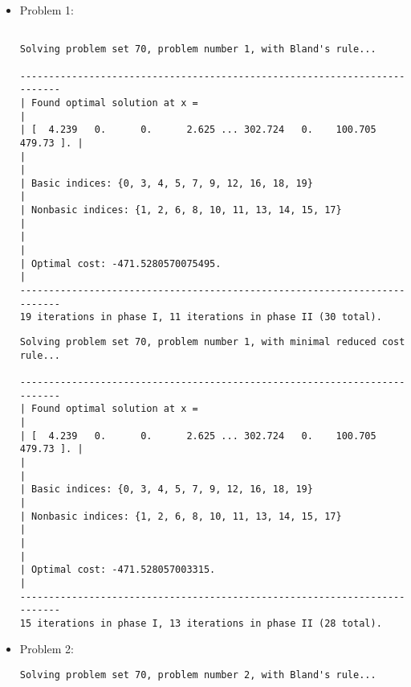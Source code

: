 \documentclass[a4paper]{article}
\begin{document}
\begin{itemize}
    \item Problem 1:
\begin{verbatim}

Solving problem set 70, problem number 1, with Bland's rule...

--------------------------------------------------------------------------
| Found optimal solution at x =                                          |
| [  4.239   0.      0.      2.625 ... 302.724   0.    100.705 479.73 ]. |
|                                                                        |
| Basic indices: {0, 3, 4, 5, 7, 9, 12, 16, 18, 19}                      |
| Nonbasic indices: {1, 2, 6, 8, 10, 11, 13, 14, 15, 17}                 |
|                                                                        |
| Optimal cost: -471.5280570075495.                                      |
--------------------------------------------------------------------------
19 iterations in phase I, 11 iterations in phase II (30 total).
\end{verbatim}

\vspace{2ex}

\begin{verbatim}
Solving problem set 70, problem number 1, with minimal reduced cost rule...

--------------------------------------------------------------------------
| Found optimal solution at x =                                          |
| [  4.239   0.      0.      2.625 ... 302.724   0.    100.705 479.73 ]. |
|                                                                        |
| Basic indices: {0, 3, 4, 5, 7, 9, 12, 16, 18, 19}                      |
| Nonbasic indices: {1, 2, 6, 8, 10, 11, 13, 14, 15, 17}                 |
|                                                                        |
| Optimal cost: -471.528057003315.                                       |
--------------------------------------------------------------------------
15 iterations in phase I, 13 iterations in phase II (28 total).

\end{verbatim}

\vspace{2ex}
    \item Problem 2:
\begin{verbatim}
Solving problem set 70, problem number 2, with Bland's rule...


\end{verbatim}
\end{itemize}
\end{document}
